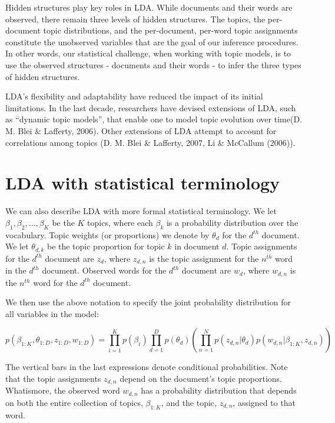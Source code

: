 \documentclass[12pt,]{article}
\begin{document}
Hidden structures play key roles in LDA. While documents and their words
are observed, there remain three levels of hidden structures. The
topics, the per-document topic distributions, and the per-document,
per-word topic assignments constitute the unobserved variables that are
the goal of our inference procedures. In other words, our statistical
challenge, when working with topic models, is to use the observed
structures - documents and their words - to infer the three types of
hidden structures.

LDA's flexibility and adaptability have reduced the impact of its
initial limitations. In the last decade, researchers have devised
extensions of LDA, such as ``dynamic topic models'', that enable one to
model topic evolution over time(D. M. Blei \& Lafferty, 2006). Other
extensions of LDA attempt to account for correlations among topics (D.
M. Blei \& Lafferty, 2007, Li \& McCallum (2006)).

\section{LDA with statistical
terminology}\label{lda-with-statistical-terminology}

We can also describe LDA with more formal statistical terminology. We
let \(\beta_1, \beta_2, ..., \beta_K\) be the \(K\) topics, where each
\(\beta_k\) is a probability distribution over the vocabulary. Topic
weights (or proportions) we denote by \(\theta_d\) for the \(d^{th}\)
document. We let \(\theta_{d,k}\) be the topic proportion for topic
\(k\) in document \(d\). Topic assignments for the \(d^{th}\) document
are \(z_d\), where \(z_{d,n}\) is the topic assignment for the
\(n^{th}\) word in the \(d^{th}\) document. Observed words for the
\(d^{th}\) document are \(w_d\), where \(w_{d, n}\) is the \(n^{th}\)
word for the \(d^{th}\) document.

We then use the above notation to specify the joint probability
distribution for all variables in the model:

\[p(\beta_{1:K}, \theta_{1:D}, z_{1:D}, w_{1:D}) = \prod_{i = 1}^Kp(\beta_i)\prod_{d = 1}^Dp(\theta_d)\left( \prod_{n = 1}^N p(z_{d,n}|\theta_d)p(w_{d,n}|\beta_{1:K}, z_{d,n})\right)\]

The vertical bars in the last expressions denote conditional
probabilities. Note that the topic assignments \(z_{d,n}\) depend on the
document's topic proportions. Whatismore, the observed word \(w_{d,n}\)
has a probability distribution that depends on both the entire
collection of topics, \(\beta_{1:K}\), and the topic, \(z_{d,n}\),
assigned to that word.
\end{document}
